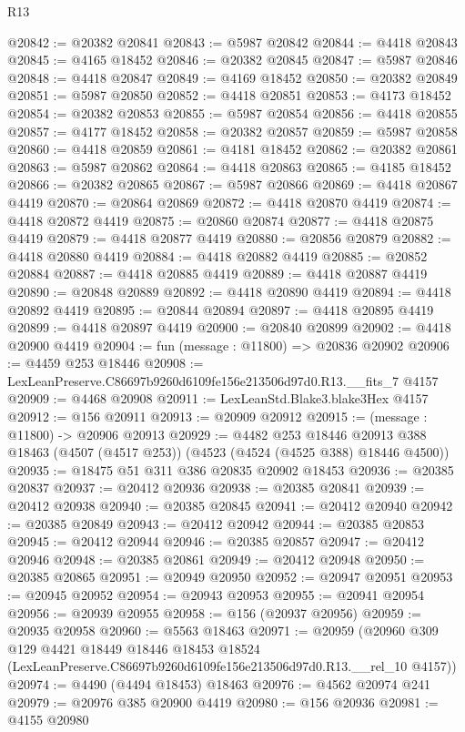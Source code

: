 \begin{lexlean}{R13}
\begin{coremodule}
@20842 := @20382 @20841
@20843 := @5987 @20842
@20844 := @4418 @20843
@20845 := @4165 @18452
@20846 := @20382 @20845
@20847 := @5987 @20846
@20848 := @4418 @20847
@20849 := @4169 @18452
@20850 := @20382 @20849
@20851 := @5987 @20850
@20852 := @4418 @20851
@20853 := @4173 @18452
@20854 := @20382 @20853
@20855 := @5987 @20854
@20856 := @4418 @20855
@20857 := @4177 @18452
@20858 := @20382 @20857
@20859 := @5987 @20858
@20860 := @4418 @20859
@20861 := @4181 @18452
@20862 := @20382 @20861
@20863 := @5987 @20862
@20864 := @4418 @20863
@20865 := @4185 @18452
@20866 := @20382 @20865
@20867 := @5987 @20866
@20869 := @4418 @20867 @4419
@20870 := @20864 @20869
@20872 := @4418 @20870 @4419
@20874 := @4418 @20872 @4419
@20875 := @20860 @20874
@20877 := @4418 @20875 @4419
@20879 := @4418 @20877 @4419
@20880 := @20856 @20879
@20882 := @4418 @20880 @4419
@20884 := @4418 @20882 @4419
@20885 := @20852 @20884
@20887 := @4418 @20885 @4419
@20889 := @4418 @20887 @4419
@20890 := @20848 @20889
@20892 := @4418 @20890 @4419
@20894 := @4418 @20892 @4419
@20895 := @20844 @20894
@20897 := @4418 @20895 @4419
@20899 := @4418 @20897 @4419
@20900 := @20840 @20899
@20902 := @4418 @20900 @4419
@20904 := fun (message : @11800) => @20836 @20902
@20906 := @4459 @253 @18446
@20908 := LexLeanPreserve.C86697b9260d6109fe156e213506d97d0.R13.__fits_7 @4157
@20909 := @4468 @20908
@20911 := LexLeanStd.Blake3.blake3Hex @4157
@20912 := @156 @20911
@20913 := @20909 @20912
@20915 := (message : @11800) -> @20906 @20913
@20929 := @4482
    @253
    @18446
    @20913
    @388
    @18463
    (@4507 (@4517 @253))
    (@4523 (@4524 (@4525 @388) @18446 @4500))
@20935 := @18475 @51 @311 @386 @20835 @20902 @18453
@20936 := @20385 @20837
@20937 := @20412 @20936
@20938 := @20385 @20841
@20939 := @20412 @20938
@20940 := @20385 @20845
@20941 := @20412 @20940
@20942 := @20385 @20849
@20943 := @20412 @20942
@20944 := @20385 @20853
@20945 := @20412 @20944
@20946 := @20385 @20857
@20947 := @20412 @20946
@20948 := @20385 @20861
@20949 := @20412 @20948
@20950 := @20385 @20865
@20951 := @20949 @20950
@20952 := @20947 @20951
@20953 := @20945 @20952
@20954 := @20943 @20953
@20955 := @20941 @20954
@20956 := @20939 @20955
@20958 := @156 (@20937 @20956)
@20959 := @20935 @20958
@20960 := @5563 @18463
@20971 := @20959
    (@20960
      @309
      @129
      @4421
      @18449
      @18446
      @18453
      @18524
      (LexLeanPreserve.C86697b9260d6109fe156e213506d97d0.R13.__rel_10 @4157))
@20974 := @4490 (@4494 @18453) @18463
@20976 := @4562 @20974 @241
@20979 := @20976 @385 @20900 @4419
@20980 := @156 @20936
@20981 := @4155 @20980

\end{coremodule}
\end{lexlean}
